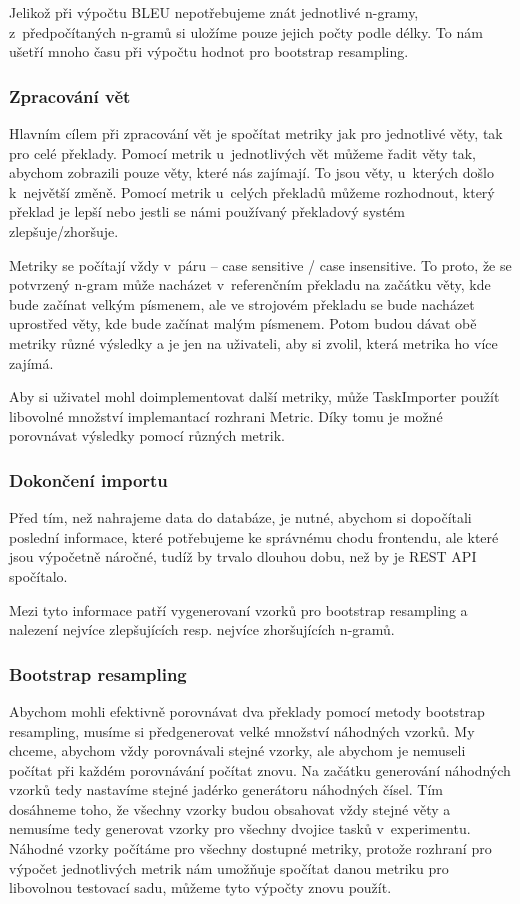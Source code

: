 Jelikož při výpočtu BLEU nepotřebujeme znát jednotlivé n-gramy,
  z~předpočítaných n-gramů si uložíme pouze jejich počty podle délky.
To nám ušetří mnoho času při výpočtu hodnot pro bootstrap resampling.

\subsubsection{Zpracování vět}
Hlavním cílem při zpracování vět je spočítat metriky jak pro jednotlivé věty,
  tak pro celé překlady.
Pomocí metrik u~jednotlivých vět můžeme řadit věty tak,
  abychom zobrazili pouze věty, 
  které nás zajímají.
To jsou věty, u~kterých došlo k~největší změně.
Pomocí metrik u~celých překladů můžeme rozhodnout,
  který překlad je lepší
  nebo jestli se námi používaný překladový systém zlepšuje/zhoršuje.

Metriky se počítají vždy v~páru -- case sensitive / case insensitive.
To proto, že se potvrzený n-gram může nacházet v~referenčním překladu na začátku věty,
  kde bude začínat velkým písmenem,
  ale ve strojovém překladu se bude nacházet uprostřed věty,
  kde bude začínat malým písmenem.
Potom budou dávat obě metriky různé výsledky 
  a je jen na uživateli,
  aby si zvolil, která metrika ho více zajímá.

Aby si uživatel mohl doimplementovat další metriky,
  může TaskImporter použít libovolné množství implemantací rozhrani Metric.
Díky tomu je možné porovnávat výsledky pomocí různých metrik.

\subsubsection{Dokončení importu}
Před tím, než nahrajeme data do databáze, je nutné,
  abychom si dopočítali poslední informace,
  které potřebujeme ke správnému chodu frontendu,
  ale které jsou výpočetně náročné,
  tudíž by trvalo dlouhou dobu,
  než by je REST API spočítalo.

Mezi tyto informace patří vygenerovaní vzorků pro bootstrap resampling a
  nalezení nejvíce zlepšujících resp. nejvíce zhoršujících n-gramů.

\subsubsection{Bootstrap resampling}
Abychom mohli efektivně porovnávat dva překlady pomocí metody bootstrap resampling,
  musíme si předgenerovat velké množství náhodných vzorků.
My chceme,
  abychom vždy porovnávali stejné vzorky,
  ale abychom je nemuseli počítat při každém porovnávání počítat znovu.
Na začátku generování náhodných vzorků tedy nastavíme stejné jadérko generátoru náhodných čísel.
Tím dosáhneme toho,
  že všechny vzorky budou obsahovat vždy stejné věty
  a nemusíme tedy generovat vzorky pro všechny dvojice tasků v~experimentu.
Náhodné vzorky počítáme pro všechny dostupné metriky,
  protože rozhraní pro výpočet jednotlivých metrik nám umožňuje spočítat danou metriku pro libovolnou testovací sadu,
  můžeme tyto výpočty znovu použít.


